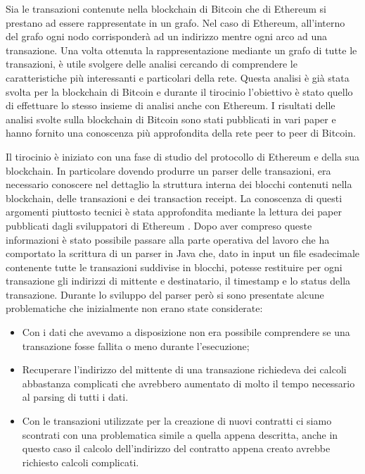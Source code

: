 \documentclass[12pt]{report}
\begin{document}
Sia le transazioni contenute nella blockchain di Bitcoin che di Ethereum si prestano ad essere rappresentate in un grafo.
Nel caso di Ethereum, all'interno del grafo ogni nodo corrisponderà ad un indirizzo mentre ogni arco ad una transazione.
Una volta ottenuta la rappresentazione mediante un grafo di tutte le transazioni, è utile svolgere delle analisi cercando di comprendere le caratteristiche più interessanti e particolari della rete.
\newline
Questa analisi è già stata svolta per la blockchain di Bitcoin e durante il tirocinio l'obiettivo è stato quello di effettuare lo stesso insieme di analisi anche con Ethereum.
I risultati delle analisi svolte sulla blockchain di Bitcoin sono stati pubblicati in vari paper \cite{maesa2016uncovering} \cite{maesa2016analysis} \cite{maesa2017data} \cite{maesa2017detecting}
e hanno fornito una conoscenza più approfondita della rete peer to peer di Bitcoin.


Il tirocinio è iniziato con una fase di studio del protocollo di Ethereum e della sua blockchain. 
In particolare dovendo produrre un parser delle transazioni, era necessario conoscere nel dettaglio la struttura interna dei blocchi contenuti nella blockchain, delle transazioni e dei transaction receipt.
La conoscenza di questi argomenti piuttosto tecnici è stata approfondita mediante la lettura dei paper pubblicati dagli sviluppatori di Ethereum \cite{YellowPaper}.
\newline
Dopo aver compreso queste informazioni è stato possibile passare alla parte operativa del lavoro che ha comportato la scrittura di un parser in Java che, dato in input un file esadecimale contenente tutte le transazioni suddivise in blocchi, potesse restituire per ogni transazione gli indirizzi di mittente e destinatario, il timestamp e lo status della transazione.
Durante lo sviluppo del parser però si sono presentate alcune problematiche che inizialmente non erano state considerate:

\begin{itemize}
    \item Con i dati che avevamo a disposizione non era possibile comprendere se una transazione fosse fallita o meno durante l'esecuzione;
    \item Recuperare l'indirizzo del mittente di una transazione richiedeva dei calcoli abbastanza complicati che avrebbero aumentato di molto il tempo necessario al parsing di tutti i dati.
    \item Con le transazioni utilizzate per la creazione di nuovi contratti ci siamo scontrati con una problematica simile a quella appena descritta, anche in questo caso il calcolo dell'indirizzo del contratto appena creato avrebbe richiesto calcoli complicati.
\end{itemize}
\end{document}
